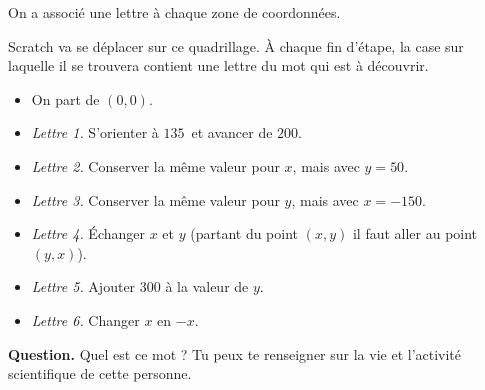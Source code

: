 \documentclass[class=report,crop=false, 12pt]{standalone}
\begin{document}
\begin{enigme}


On a associé une lettre à chaque zone de coordonnées.



Scratch va se déplacer sur ce quadrillage. À chaque fin d'étape, la case sur laquelle il se trouvera contient une lettre du mot qui est à découvrir.

\begin{itemize}
  \item On part de $(0,0)$.
  \item \emph{Lettre 1.} S'orienter à $135$\textdegree\ et avancer de $200$.
  \item \emph{Lettre 2.} Conserver la même valeur pour $x$, mais avec $y=50$.
  \item \emph{Lettre 3.} Conserver la même valeur pour $y$, mais avec $x=-150$.
  \item \emph{Lettre 4.} Échanger $x$ et $y$ (partant du point $(x,y)$ il faut aller au point $(y,x)$).
  \item \emph{Lettre 5.} Ajouter $300$ à la valeur de $y$.
  \item \emph{Lettre 6.} Changer $x$ en $-x$.  
\end{itemize}


\bigskip

\textbf{Question.} Quel est ce mot ? Tu peux te renseigner sur la vie et l'activité scientifique de cette personne.




\end{enigme}
\end{document}
